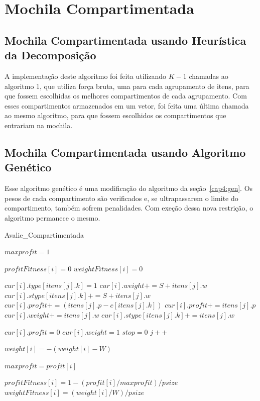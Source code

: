 \newpage

\section{Mochila Compartimentada}
\subsection{Mochila Compartimentada usando Heurística da Decomposição}
A implementação deste algoritmo foi feita utilizando $K - 1$ chamadas ao algoritmo 1, que utiliza força bruta, uma para cada agrupamento de itens, para que fossem escolhidas os melhores compartimentos de cada agrupamento. Com esses compartimentos armazenados em um vetor, foi feita uma última chamada ao mesmo algoritmo, para que fossem escolhidos os compartimentos que entrariam na mochila.

\subsection{Mochila Compartimentada usando Algoritmo Genético}
Esse algoritmo genético é uma modificação do algoritmo da seção~\ref{cap4:gen}. Os pesos de cada compartimento são verificados e, se ultrapassarem o limite do compartimento, também sofrem penalidades. Com exeção dessa nova restrição, o algoritmo permanece o mesmo.


\begin{algorithm}
\caption{Avalie\_Compartimentada} %
\scriptsize
\begin{algorithmic}[1]

  \STATE $maxprofit = 1$

    \STATE $profitFitness[i] = 0$
    \STATE $weightFitness[i] = 0$



					\STATE $cur[i].type[itens[j].k] = 1$
					\STATE $cur[i].weight += S + itens[j].w$
					\STATE $cur[i].stype[itens[j].k] += S + itens[j].w$
					\STATE $cur[i].profit += (itens[j].p - c[itens[j].k])$
				\ELSE
					\STATE $cur[i].profit += itens[j].p$
					\STATE $cur[i].weight += itens[j].w$
					\STATE $cur[i].stype[itens[j].k] += itens[j].w$
				\ENDIF

					\STATE $cur[i].profit = 0$
					\STATE $cur[i].weight = 1$
					\STATE $stop = 0$
				\ENDIF
			\ENDIF
			\STATE $j++$
    \ENDWHILE

      \STATE $weight[i] = -(weight[i] - W)$
		\ENDIF

      \STATE $maxprofit = profit[i]$
		\ENDIF
  \ENDFOR

    \STATE $profitFitness[i] = 1 - (profit[i] / maxprofit) / psize$
    \STATE $weightFitness[i] = (weight[i] / W) / psize$
  \ENDFOR

\end{algorithmic}
\end{algorithm}


